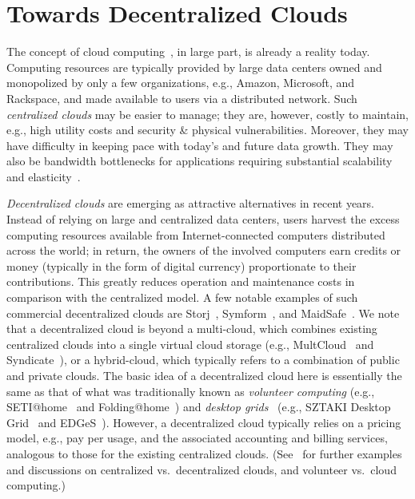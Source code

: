 \section{Towards Decentralized Clouds} \label{sect:decentralized-clouds}

The concept of cloud computing~\cite{AFG+10}, in large part, is already a reality today.
Computing resources are typically provided by large data centers owned and monopolized by only a few organizations, e.g., Amazon, Microsoft, and Rackspace, and made available to users via a distributed network.
Such {\em centralized clouds} may be easier to manage; they are, however, costly to maintain, e.g., high utility costs and security \& physical vulnerabilities.
Moreover, they may have difficulty in keeping pace with today's and future data growth.
They may also be bandwidth bottlenecks for applications requiring substantial scalability and elasticity~\cite{symform-slide,techrepublic}.

{\em Decentralized clouds} are emerging as attractive alternatives in recent years.
Instead of relying on large and centralized data centers, users harvest the excess computing resources available from Internet-connected computers distributed across the world; in return, the owners of the involved computers earn credits or money (typically in the form of digital currency) proportionate to their contributions.
This greatly reduces operation and maintenance costs in comparison with the centralized model.
A few notable examples of such commercial decentralized clouds are Storj~\cite{Storj}, Symform~\cite{Symform}, and MaidSafe~\cite{MaidSafe}.
We note that a decentralized cloud is beyond a multi-cloud, which combines existing centralized clouds into a single virtual cloud storage (e.g., MultCloud~\cite{MultCloud} and Syndicate~\cite{Syndicate}), or a hybrid-cloud, which typically refers to a combination of public and private clouds.
The basic idea of a decentralized cloud here is essentially the same as that of what was traditionally known as {\em volunteer computing} (e.g., SETI@home~\cite{Seti@home} and Folding@home~\cite{Folding@home}) and {\em desktop grids}~\cite{CKB+07} (e.g., SZTAKI Desktop Grid~\cite{sztaki} and EDGeS~\cite{edges}).
However, a decentralized cloud typically relies on a pricing model, e.g., pay per usage, and the associated accounting and billing services, analogous to those for the existing centralized clouds.
(See~\cite{DP12,CWH13,MKK13} for further examples and discussions on centralized vs.\ decentralized clouds, and volunteer vs.\ cloud computing.)

